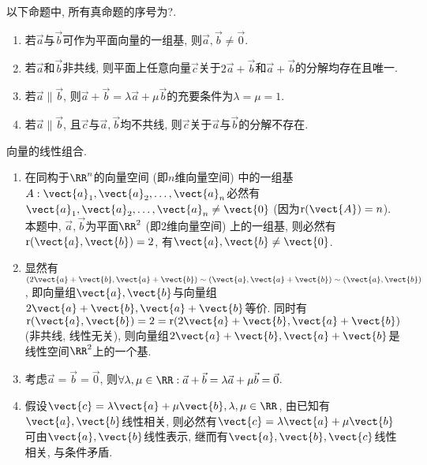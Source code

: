 \documentclass[8pt]{article}
\begin{document}
		\begin{easonbigproblem}
			以下命题中, 所有真命题的序号为?.
			\begin{enumerate}[label = \calword{(\arabic*)}]
				\item 若\(\vec{a}\)与\(\vec{b}\)可作为平面向量的一组基, 则\(\vec{a}, \vec{b} \neq \vec{0}\).
				\item 若\(\vec{a}\)和\(\vec{b}\)非共线, 则平面上任意向量\(\vec{c}\)关于\(2 \vec{a} + \vec{b}\)和\(\vec{a} + \vec{b}\)的分解均存在且唯一.
				\item 若\(\vec{a} \parallel \vec{b}\), 则\(\vec{a} + \vec{b} = \lambda \vec{a} + \mu \vec{b}\)的充要条件为\(\lambda = \mu = 1\).
				\item 若\(\vec{a} \parallel \vec{b}\), 且\(\vec{c}\)与\(\vec{a}, \vec{b}\)均不共线, 则\(\vec{c}\)关于\(\vec{a}\)与\(\vec{b}\)的分解不存在.
			\end{enumerate}
			\subbigproblem
			 向量的线性组合.
			\begin{enumerate}[label = \calword{(\arabic*)}]
				\item 在同构于\(\RR^n\)的向量空间 (即\(n\)维向量空间) 中的一组基\(A: \vect{a}_1, \vect{a}_2, \ldots, \vect{a}_n\)必然有\(\vect{a}_1, \vect{a}_2, \ldots, \vect{a}_n \neq \vect{0}\) (因为\(\mathrm{r}(\vect{A}) = n\)). 本题中, \(\vec{a}, \vec{b}\)为平面\(\RR^2\) (即\(2\)维向量空间) 上的一组基, 则必然有\(\mathrm{r} (\vect{a}, \vect{b}) = 2\), 有\(\vect{a}, \vect{b} \neq \vect{0}\). \cite{linearalgebra-tj}
				\item 显然有\((2\vect{a} + \vect{b}, \vect{a} + \vect{b}) \sim (\vect{a}, \vect{a} + \vect{b}) \sim (\vect{a}, \vect{b})\), 即向量组\(\vect{a}, \vect{b}\)与向量组\(2\vect{a} + \vect{b}, \vect{a} + \vect{b}\)等价. 同时有\(\mathrm{r} (\vect{a}, \vect{b}) = 2 = \mathrm{r}(2\vect{a} + \vect{b}, \vect{a} + \vect{b})\) (非共线, 线性无关), 则向量组\(2\vect{a} + \vect{b}, \vect{a} + \vect{b}\)是线性空间\(\RR^2\)上的一个基. \cite{linearalgebra-pearson}
    			\item 考虑\(\vec{a} = \vec{b} = \vec{0}\), 则\(\forall \lambda, \mu \in \RR: \vec{a} + \vec{b} = \lambda \vec{a} + \mu \vec{b} = \vec{0}\).
       			\item 假设\(\vect{c} = \lambda \vect{a} + \mu \vect{b}, \lambda, \mu \in \RR\), 由已知有\(\vect{a}, \vect{b}\)线性相关, 则必然有\(\vect{c} = \lambda \vect{a} + \mu \vect{b}\)可由\(\vect{a}, \vect{b}\)线性表示, 继而有\(\vect{a}, \vect{b}, \vect{c}\)线性相关, 与条件矛盾.
			\end{enumerate}
		\end{easonbigproblem}
	
\end{document}
